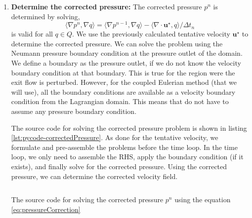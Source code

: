 \begin{enumerate}
		\begin{listing}[t]
		\inputminted[fontseries=courier,obeytabs,fontsize=\scriptsize,mathescape,linenos,numbersep=5pt,frame=lines,framesep=2mm,xleftmargin=20mm,xrightmargin=20mm]{python}{figures/eulerian/tentativeVelocity.py}
		\caption{The source code for solving the tentative velocity $\mathbf{u}^{\star}$, using the equation \ref{eq:tentativeVel}}
		\label{lst:pycode-tentativeVelocity}
		\end{listing}
	
	\item \textbf{Determine the corrected pressure:} The corrected pressure $p^n$ is determined by solving,	
		\begin{equation}
		\langle \nabla p^n, \nabla q \rangle = \langle \nabla p^{n-1}, \nabla q\rangle - \langle \nabla \cdot \mathbf{u}^{\star}, q \rangle / \Delta t_n
		\label{eq:pressureCorrection}
		\end{equation}
	is valid for all $q \in Q$. We use the previously calculated tentative velocity $\mathbf{u}^{\star}$ to determine the corrected pressure. We can solve the problem using the Neumann pressure boundary condition at the pressure outlet of the domain. We define a boundary as the pressure outlet, if we do not know the velocity boundary condition at that boundary. This is true for the region were the exit flow is perturbed. However, for the coupled Eulerian method (that we will use), all the boundary conditions are available as a velocity boundary condition from the Lagrangian domain. This means that do not have to assume any pressure boundary condition.

	The source code for solving the  corrected pressure problem is shown in listing \ref{lst:pycode-correctedPressure}. As done for the tentative velocity, we formulate and pre-assemble the problems before the time loop. In the time loop, we only need to assemble the RHS, apply the boundary condition (if it exists), and finally solve for the corrected pressure. Using the corrected pressure, we can determine the corrected velocity field. 
		
		\begin{listing}[p]
		\inputminted[fontseries=courier,obeytabs,fontsize=\scriptsize,mathescape,linenos,numbersep=5pt,frame=lines,framesep=2mm,xleftmargin=20mm,xrightmargin=20mm]{python}{figures/eulerian/correctedPressure.py}
		\caption{The source code for solving the corrected pressure $p^n$ using the equation \ref{eq:pressureCorrection}}
		\label{lst:pycode-correctedPressure}
		\end{listing}
			

\end{enumerate}
